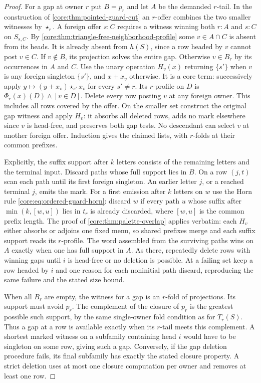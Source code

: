 \begin{proof}
For a gap at owner $r$ put $B=p_r$ and let $A$ be the demanded
$r$-tail. In the construction of
\cref{core:thm:pointed-guard-cut} an $r$-offer combines the two
smaller witnesses by $\star_r$. A foreign offer $s:C$ requires a
witness winning both $r:A$ and $s:C$ on $S_{s,C}$. By
\cref{core:thm:triangle-free-neighborhood-profile} some
$v\in A\cap C$ is absent from its heads. It is already absent from
$h(S)$, since a row headed by $v$ cannot post $v\in C$.
If $v\notin B$, its projection solves the entire gap. Otherwise
$v\in B_r$ by its occurrences in $A$ and $C$. Use
the unary operation $H_v(x)$ returning $\{s'\}$ when $v$ is any
foreign singleton $\{s'\}$, and $x+x_v$ otherwise. It is a core
term: successively apply $y\mapsto(y+x_v)\star_{s'}x_v$ for every
$s'\ne r$. Its $r$-profile on $D$ is $\Phi_r(x)(D)\land[v\in D]$.
Delete every row posting $v$ at any foreign owner. This includes all
rows covered by the offer. On the smaller set construct the original
gap witness and apply $H_v$: it absorbs all deleted rows, adds no
mark elsewhere since $v$ is head-free, and preserves both gap tests.
No descendant can select $v$ at another foreign offer. Induction gives
the claimed lists, with $r$-folds at their common prefixes.

Explicitly, the suffix support after $k$ letters consists of the
remaining letters and the terminal input. Discard paths whose full
support lies in $B$. On a row $(j,t)$ scan each path until its first
foreign singleton. An earlier letter $j$, or a reached terminal $j$,
emits the mark. For a first emission after $k$ letters on $w$ use the
Horn rule \eqref{core:eq:ordered-guard-horn}: discard $w$ if every
path $u$ whose suffix after $\min(k,[w,u])$ lies in $t_r$ is already
discarded, where $[w,u]$ is the common prefix length. The proof of
\cref{core:thm:palette-overlap} applies verbatim: each $H_v$ either
absorbs or adjoins one fixed menu, so shared prefixes merge and each
suffix support reads its $r$-profile. The word assembled from the
surviving paths wins on $A$ exactly when one has full support in $A$.
As there, repeatedly delete rows
with winning gaps until $i$ is head-free or no deletion is possible.
At a failing set keep a row headed by $i$ and one reason for each
noninitial path discard, reproducing the same failure and the stated
size bound.

When all $B_r$ are empty, the witness for a gap is an $r$-fold of
projections. Its support must avoid $p_r$. The complement of the
closure of $p_r$ is the greatest possible such support, by the same
single-owner fold condition as for $T_r(S)$. Thus a gap at a row is
available exactly when its $r$-tail meets this complement.
A shortest marked witness on a subfamily containing head $i$ would
have to be singleton on some row, giving such a gap. Conversely, if the gap deletion
procedure fails, its final subfamily has exactly the stated closure
property. A strict deletion uses at most one closure computation
per owner and removes at least one row.
\end{proof}

